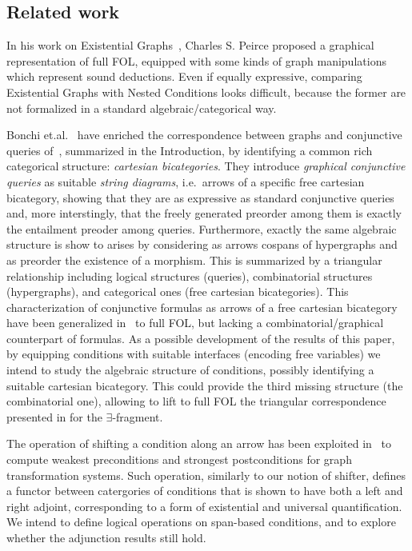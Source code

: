 \subsection{Related work}

In his work on Existential Graphs~\cite{roberts1973-the-existential-graphs-of-charles-s.-peirce}, Charles S. Peirce proposed a graphical representation of full FOL, equipped with some kinds of graph manipulations which represent sound deductions. Even if equally expressive, comparing Existential Graphs with Nested Conditions looks difficult, because the former are not formalized in a standard algebraic/categorical way.

Bonchi et.al.~\cite{DBLP:conf/csl/BonchiSS18} have enriched the correspondence between graphs and conjunctive queries of~\cite{DBLP:conf/stoc/ChandraM77}, summarized in the Introduction,  by identifying a common rich categorical structure: \emph{cartesian bicategories}. They introduce \emph{graphical conjunctive queries} as suitable \emph{string diagrams}, i.e.~arrows of a specific free cartesian bicategory, showing that they are as expressive as standard conjunctive queries and, more interstingly, that the freely generated preorder among them is exactly the entailment preoder among queries. Furthermore, exactly the same algebraic structure is show to arises by considering as arrows cospans of hypergraphs and as preorder the existence of a morphism. This is summarized by a triangular relationship including logical structures (queries), combinatorial structures (hypergraphs), and categorical ones (free cartesian bicategories).  This characterization of conjunctive formulas as arrows of a free cartesian bicategory have been generalized in~\cite{DBLP:journals/corr/abs-2404-18795} to full FOL, but lacking a combinatorial/graphical counterpart of formulas. As a possible development of the results of this paper, by equipping conditions with suitable interfaces (encoding free variables) we intend to study the algebraic structure of conditions, possibly identifying a suitable cartesian bicategory.  This could provide the third missing structure (the combinatorial one), allowing to lift to full FOL the triangular correspondence presented in \cite{DBLP:conf/csl/BonchiSS18} for the $\exists$-fragment.


The operation of shifting a condition along an arrow has been exploited 
in~\cite{bchk:conditional-reactive-systems} to compute weakest preconditions and strongest postconditions for graph transformation systems. Such operation, similarly to our notion of shifter, defines a functor between catergories of conditions that is shown to have both a left and right adjoint, corresponding to a form of existential and universal quantification.  We intend to define logical operations on span-based conditions, and to explore whether the adjunction results still hold.

